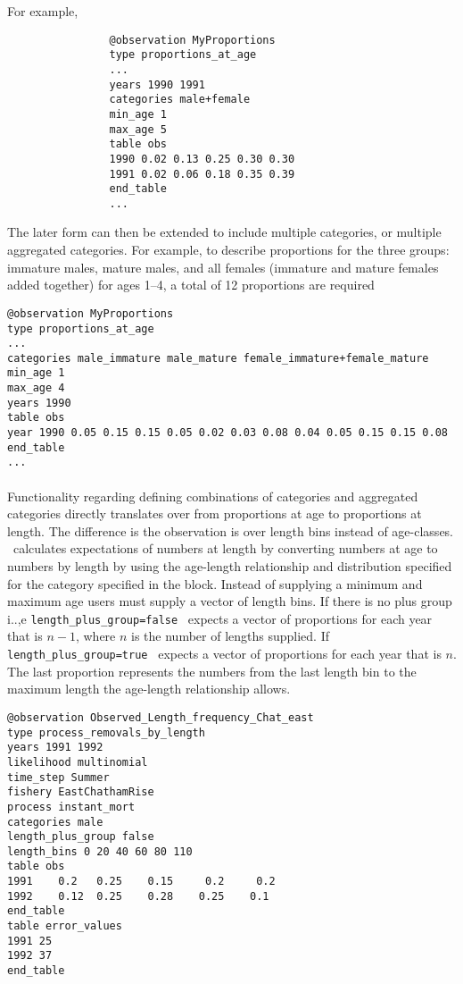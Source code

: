 For example,
		
{\small{\begin{verbatim}
				@observation MyProportions
				type proportions_at_age 
				...
				years 1990 1991
				categories male+female
				min_age 1
				max_age 5
				table obs
				1990 0.02 0.13 0.25 0.30 0.30
				1991 0.02 0.06 0.18 0.35 0.39
				end_table
				...
				\end{verbatim}}}
				
The later form can then be extended to include multiple categories, or multiple aggregated categories. For example, to describe proportions for the three groups: immature males, mature males, and all females (immature and mature females added together) for ages 1--4, a total of 12 proportions are required 
				
{\small{\begin{verbatim}
@observation MyProportions
type proportions_at_age
...
categories male_immature male_mature female_immature+female_mature
min_age 1
max_age 4
years 1990
table obs
year 1990 0.05 0.15 0.15 0.05 0.02 0.03 0.08 0.04 0.05 0.15 0.15 0.08
end_table
...
\end{verbatim}}}


\paragraph*{}
Functionality regarding defining combinations of categories and aggregated categories directly translates over from proportions at age to proportions at length. The difference is the observation is over length bins instead of age-classes. \CNAME\ calculates expectations of numbers at length by converting numbers at age to numbers by length by using the age-length relationship and distribution specified for the category specified in the  block. Instead of supplying a minimum and maximum age users must supply a vector of length bins. If there is no plus group i..,e \texttt{length\_plus\_group=false} \CNAME\ expects a vector of proportions for each year that is $n - 1$, where $n$ is the number of lengths supplied. If \texttt{length\_plus\_group=true} \CNAME\ expects a vector of proportions for each year that is $n$. The last proportion represents the numbers from the last length bin to the maximum length the age-length relationship allows.


{\small{\begin{verbatim}
@observation Observed_Length_frequency_Chat_east
type process_removals_by_length
years 1991 1992
likelihood multinomial
time_step Summer
fishery EastChathamRise
process instant_mort
categories male
length_plus_group false
length_bins 0 20 40 60 80 110
table obs
1991    0.2   0.25    0.15     0.2     0.2 
1992    0.12  0.25    0.28    0.25    0.1 
end_table
table error_values
1991 25
1992 37
end_table  
\end{verbatim}}}
 
